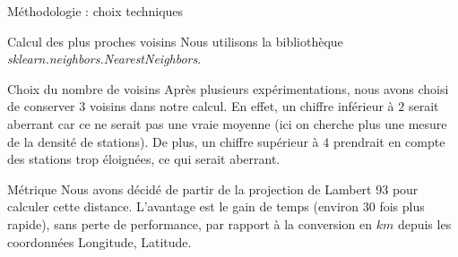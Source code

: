 \begin{frame}{Méthodologie : choix techniques}
    \begin{block}{Calcul des plus proches voisins}
        Nous utilisons la bibliothèque \emph{sklearn.neighbors.NearestNeighbors}\footnotemark.
    \end{block}

    \begin{block}{Choix du nombre de voisins}
        Après plusieurs expérimentations, nous avons choisi de conserver $3$ voisins dans notre calcul.
        En effet, un chiffre inférieur à $2$ serait aberrant car ce ne serait pas une vraie moyenne (ici on cherche plus une mesure de la densité de stations).
        De plus, un chiffre supérieur à $4$ prendrait en compte des stations trop éloignées, ce qui serait aberrant.
    \end{block}
    
    \begin{block}{Métrique}
        Nous avons décidé de partir de la projection de Lambert 93 pour calculer cette distance.
        L'avantage est le gain de temps (environ 30 fois plus rapide), sans perte de performance, par rapport à la conversion en $\unit{km}$ depuis les coordonnées Longitude, Latitude.
    \end{block}

\end{frame}

